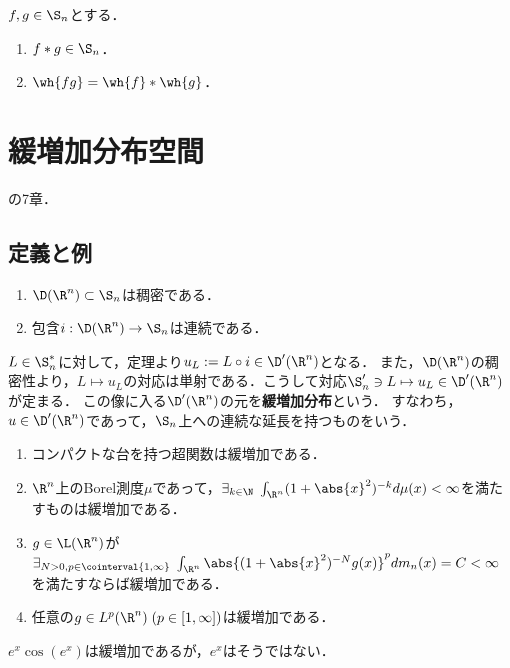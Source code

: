 \documentclass[uplatex,dvipdfmx]{jsreport}
\begin{document}
\begin{theorem}
    $f,g\in\S_n$とする．
    \begin{enumerate}
        \item $f*g\in\S_n$．
        \item $\wh{fg}=\wh{f}*\wh{g}$．
    \end{enumerate}
\end{theorem}

\section{緩増加分布空間}

\begin{tcolorbox}[colframe=ForestGreen, colback=ForestGreen!10!white,breakable,colbacktitle=ForestGreen!40!white,coltitle=black,fonttitle=\bfseries\sffamily,
title=]
    \cite{Rudin-FunctionalAnalysis}の7章．
\end{tcolorbox}

\subsection{定義と例}

\begin{theorem}\mbox{}
    \begin{enumerate}
        \item $\D(\R^n)\subset\S_n$は稠密である．
        \item 包含$i:\D(\R^n)\to\S_n$は連続である．
    \end{enumerate}
\end{theorem}

\begin{definition}
    $L\in\S_n^*$に対して，定理より$u_L:=L\circ i\in\D'(\R^n)$となる．
    また，$\D(\R^n)$の稠密性より，$L\mapsto u_L$の対応は単射である．こうして対応$\S'_n\ni L\mapsto u_L\in\D'(\R^n)$が定まる．
    この像に入る$\D'(\R^n)$の元を\textbf{緩増加分布}という．
    すなわち，$u\in\D'(\R^n)$であって，$\S_n$上への連続な延長を持つものをいう．
\end{definition}

\begin{example}[任意の可積分関数は緩増加である]\mbox{}
    \begin{enumerate}
        \item コンパクトな台を持つ超関数は緩増加である．
        \item $\R^n$上のBorel測度$\mu$であって，$\exists_{k\in\N}\;\int_{\R^n}(1+\abs{x}^2)^{-k}d\mu(x)<\infty$を満たすものは緩増加である．
        \item $g\in\L(\R^n)$が$\exists_{N>0,p\in\cointerval{1,\infty}}\;\int_{\R^n}\abs{(1+\abs{x}^2)^{-N}g(x)}^pdm_n(x)=C<\infty$を満たすならば緩増加である．
        \item 任意の$g\in L^p(\R^n)\;(p\in[1,\infty])$は緩増加である．
    \end{enumerate}
    $e^x\cos(e^x)$は緩増加であるが，$e^x$はそうではない．
\end{example}
\end{document}
